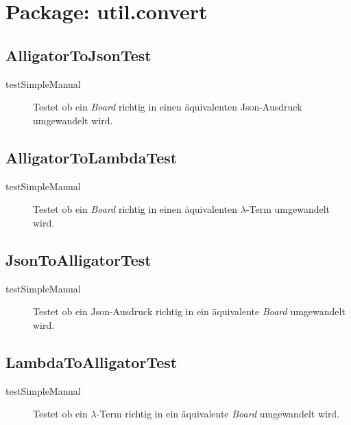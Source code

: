 \section{Package: util.convert}
\subsection{AlligatorToJsonTest}
	\begin{description}
		\item[testSimpleManual] Testet ob ein \emph{Board} richtig in einen äquivalenten Json-Ausdruck umgewandelt wird.
	\end{description}
\subsection{AlligatorToLambdaTest}
	\begin{description}
		\item[testSimpleManual] Testet ob ein \emph{Board} richtig in einen äquivalenten \(\lambda\)-Term umgewandelt wird.
	\end{description}	
\subsection{JsonToAlligatorTest}
	\begin{description}
		\item[testSimpleManual] Testet ob ein Json-Ausdruck richtig in ein äquivalente \emph{Board} umgewandelt wird.
	\end{description}	
\subsection{LambdaToAlligatorTest}
	\begin{description}
		\item[testSimpleManual] Testet ob ein \(\lambda\)-Term richtig in ein äquivalente \emph{Board} umgewandelt 
			wird.
	\end{description}	
